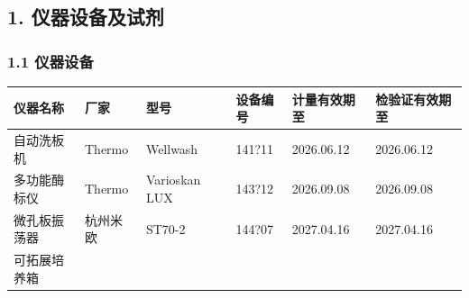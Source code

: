 \documentclass[UTF8,10pt,a4paper,fontset=fandol]{ctexart}
\newcommand{\fieldvalue}[1]{#1}
\newcommand{\handwritten}[1]{#1}
\begin{document}
\subsection*{1. 仪器设备及试剂}

\subsubsection*{1.1 仪器设备}

\small
\begin{tabular}{|p{2.0cm}|p{1.7cm}|p{2.0cm}|p{2.1cm}|p{2.1cm}|p{2.1cm}|}
\hline
仪器名称 & 厂家 & 型号 & 设备编号 & 计量有效期至 & 检验证有效期至 \\
\hline
自动洗板机 &
\fieldvalue{Thermo} &
\fieldvalue{Wellwash} &
\fieldvalue{\handwritten{141?11}} &
\fieldvalue{\handwritten{2026.06.12}} &
\fieldvalue{\handwritten{2026.06.12}} \\
\hline
多功能酶标仪 &
\fieldvalue{Thermo} &
\fieldvalue{Varioskan LUX} &
\fieldvalue{\handwritten{143?12}} &
\fieldvalue{\handwritten{2026.09.08}} &
\fieldvalue{\handwritten{2026.09.08}} \\
\hline
微孔板振荡器 &
\fieldvalue{杭州米欧} &
\fieldvalue{ST70-2} &
\fieldvalue{\handwritten{144?07}} &
\fieldvalue{\handwritten{2027.04.16}} &
\fieldvalue{\handwritten{2027.04.16}} \\
\hline
可拓展培养箱 &

\end{tabular}
\end{document}
